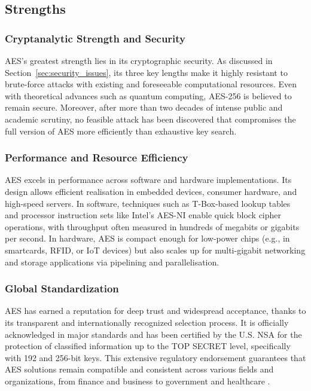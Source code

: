 \subsection{Strengths}

\subsubsection*{Cryptanalytic Strength and Security}

AES's greatest strength lies in its cryptographic security. As discussed in Section~\ref{sec:security_issues}, its three key lengths make it highly resistant 
to brute-force attacks with existing and foreseeable computational resources. Even with theoretical advances such as quantum computing, 
AES-256 is believed to remain secure. Moreover, after more than two decades of intense public and academic scrutiny, no feasible attack 
has been discovered that compromises the full version of AES more efficiently than exhaustive key search.

\subsubsection*{Performance and Resource Efficiency}

AES excels in performance across software and hardware implementations. Its design allows efficient realisation in embedded devices, 
consumer hardware, and high-speed servers. In software, techniques such as T-Box-based lookup tables and processor instruction sets 
like Intel's AES-NI enable quick block cipher operations, with throughput often measured in hundreds of megabits or gigabits per second. 
In hardware, AES is compact enough for low-power chips (e.g., in smartcards, \Gls{RFID}, or \Gls{IoT} devices) but also scales up for multi-gigabit 
networking and storage applications via pipelining and parallelisation.

\subsubsection*{Global Standardization}

AES has earned a reputation for deep trust and widespread acceptance, thanks to its transparent and internationally recognized selection 
process. It is officially acknowledged in major standards and has been certified by the U.S. NSA for the protection of classified information 
up to the TOP SECRET level, specifically with 192 and 256-bit keys. This extensive regulatory endorsement guarantees that AES solutions remain 
compatible and consistent across various fields and organizations, from finance and business to government and healthcare \cite{cooper2025aes}.